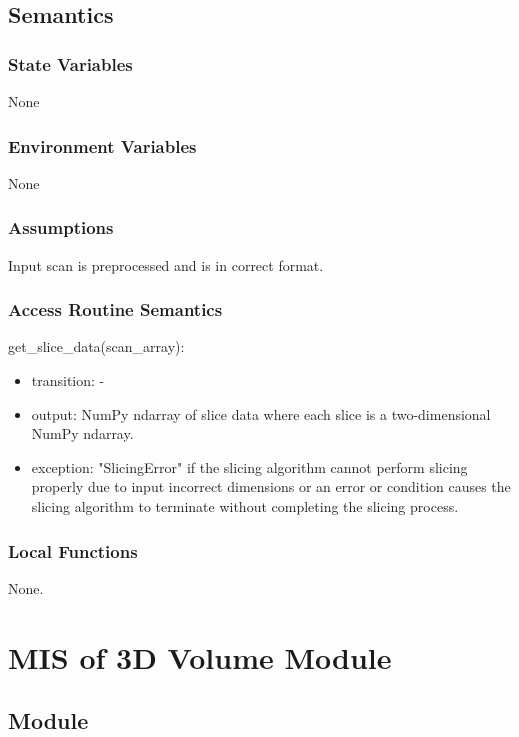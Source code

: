 \documentclass[12pt, titlepage]{article}
\begin{document}
\subsection{Semantics}

\subsubsection{State Variables}

None

\subsubsection{Environment Variables}

None

\subsubsection{Assumptions}

Input scan is preprocessed and is in correct format.

\subsubsection{Access Routine Semantics}

\noindent get\_slice\_data(scan\_array):
\begin{itemize}
  \item transition: -
  \item output: NumPy ndarray of slice data where each slice is a two-dimensional NumPy ndarray.
  \item exception: "SlicingError" if the slicing algorithm cannot perform slicing properly due
        to input incorrect dimensions or an error or condition causes the slicing algorithm to terminate without completing the slicing process.
\end{itemize}


\subsubsection{Local Functions}
None.

\newpage
\section{MIS of 3D Volume Module} \label{3DV}


\subsection{Module}
\end{document}
